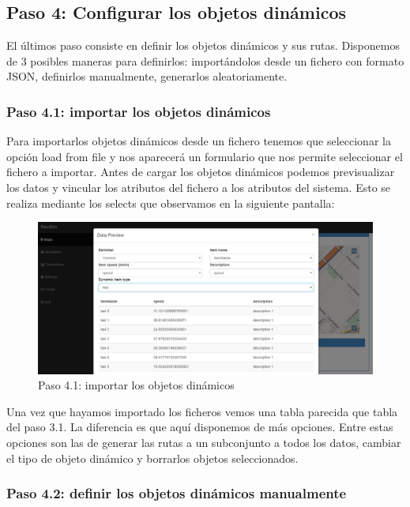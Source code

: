 \subsection{Paso 4: Configurar los objetos dinámicos}

El últimos paso consiste en definir los objetos dinámicos y sus rutas. Disponemos de 3 posibles maneras para definirlos: importándolos desde un fichero con formato JSON, definirlos manualmente, generarlos aleatoriamente.

\subsubsection{Paso 4.1: importar los objetos dinámicos}

Para importarlos objetos dinámicos desde un fichero tenemos que seleccionar la opción load from file y nos aparecerá un formulario que nos permite seleccionar el fichero a importar. Antes de cargar los objetos dinámicos podemos previsualizar los datos y vincular los atributos del fichero a los atributos del sistema. Esto se realiza mediante los selects que observamos en la siguiente pantalla:

\begin{figure}[H]
	\centering\includegraphics[scale=0.35]{imagenes/capitulo9/crear-escena-8.JPG}
	\caption{Paso 4.1: importar los objetos dinámicos}
	\label{img:paso4-1}
\end{figure}

Una vez que hayamos importado los ficheros vemos una tabla parecida que tabla del paso 3.1. La diferencia es que aquí disponemos de más opciones. Entre estas opciones son las de generar las rutas a un subconjunto a todos los datos, cambiar el tipo de objeto dinámico y borrarlos objetos seleccionados.

\subsubsection{Paso 4.2: definir los objetos dinámicos manualmente}

